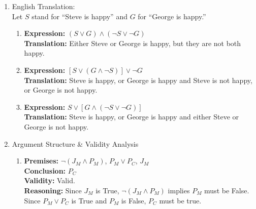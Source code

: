 \begin{enumerate}
\begin{enumerate}
  \item \textbf{Expression:} $\neg P \land \neg S$ \\
    \textbf{Literal Translation:} I will not buy the pants and i will not buy the shirt. \\
    \textbf{Natural English:} I will buy neither the pants nor the shirt.

  \item \textbf{Expression:} $\neg P \lor \neg S$ \\
    \textbf{Literal Translation:} I will not buy the pants or i will not buy the shirt. \\
    \textbf{Natural English:} I won't buy both the pants and the shirt.
  \end{enumerate}

\item English Translation: \\
  Let $S$ stand for ``Steve is happy'' and $G$ for ``George is happy.''
  \begin{enumerate}
  \item \textbf{Expression:} $(S \lor G) \land (\neg S \lor \neg G)$ \\
    \textbf{Translation:} Either Steve or George is happy, but they are not both happy.

  \item \textbf{Expression:} $[S \lor (G \land \neg S)] \lor \neg G$ \\
    \textbf{Translation:} Steve is happy, or George is happy and Steve is not happy, or George is not happy.

  \item \textbf{Expression:} $S \lor [G \land (\neg S \lor \neg G)]$ \\
    \textbf{Translation:} Steve is happy, or George is happy and either Steve or George is not happy.
  \end{enumerate}

\item Argument Structure \& Validity Analysis
  \begin{enumerate}
  \item \textbf{Premises:} $\neg(J_M \land P_M)$, $P_M \lor P_C$, $J_M$ \\
    \textbf{Conclusion:} $P_C$ \\
    \textbf{Validity:} Valid. \\
    \textbf{Reasoning:} Since $J_M$ is True, $\neg(J_M \land P_M)$ implies $P_M$ must be False. Since $P_M \lor P_C$ is True and $P_M$ is False, $P_C$ must be true.


\end{enumerate}
\end{enumerate}
